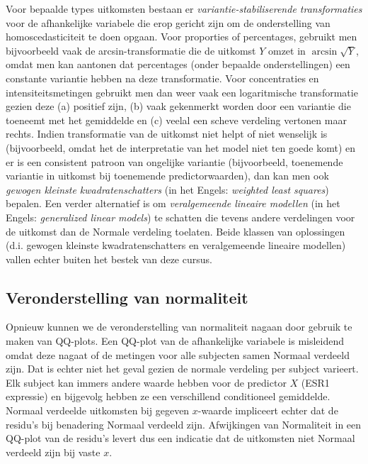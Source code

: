 \documentclass[12pt,dutch,coursenotes]{book}
\theoremstyle{definition}
\theoremstyle{definition}
\theoremstyle{definition}
\theoremstyle{remark}
\begin{document}
Voor bepaalde types uitkomsten bestaan er \emph{variantie-stabiliserende
transformaties} voor de afhankelijke variabele die erop gericht zijn om
de onderstelling van homoscedasticiteit te doen opgaan. Voor proporties
of percentages, gebruikt men bijvoorbeeld vaak de arcsin-transformatie
die de uitkomst \(Y\) omzet in \(\arcsin\sqrt{Y}\), omdat men kan
aantonen dat percentages (onder bepaalde onderstellingen) een constante
variantie hebben na deze transformatie. Voor concentraties en
intensiteitsmetingen gebruikt men dan weer vaak een logaritmische
transformatie gezien deze (a) positief zijn, (b) vaak gekenmerkt worden
door een variantie die toeneemt met het gemiddelde en (c) veelal een
scheve verdeling vertonen maar rechts. Indien transformatie van de
uitkomst niet helpt of niet wenselijk is (bijvoorbeeld, omdat het de
interpretatie van het model niet ten goede komt) en er is een consistent
patroon van ongelijke variantie (bijvoorbeeld, toenemende variantie in
uitkomst bij toenemende predictorwaarden), dan kan men ook \emph{gewogen
kleinste kwadratenschatters} (in het Engels: \emph{weighted least
squares}) bepalen. Een verder alternatief is om \emph{veralgemeende
lineaire modellen} (in het Engels: \emph{generalized linear models}) te
schatten die tevens andere verdelingen voor de uitkomst dan de Normale
verdeling toelaten. Beide klassen van oplossingen (d.i. gewogen kleinste
kwadratenschatters en veralgemeende lineaire modellen) vallen echter
buiten het bestek van deze cursus.

\subsection{Veronderstelling van
normaliteit}\label{veronderstelling-van-normaliteit}

Opnieuw kunnen we de veronderstelling van normaliteit nagaan door
gebruik te maken van QQ-plots. Een QQ-plot van de afhankelijke variabele
is misleidend omdat deze nagaat of de metingen voor alle subjecten samen
Normaal verdeeld zijn. Dat is echter niet het geval gezien de normale
verdeling per subject varieert. Elk subject kan immers andere waarde
hebben voor de predictor \(X\) (ESR1 expressie) en bijgevolg hebben ze
een verschillend conditioneel gemiddelde. Normaal verdeelde uitkomsten
bij gegeven \(x\)-waarde impliceert echter dat de residu's bij
benadering Normaal verdeeld zijn. Afwijkingen van Normaliteit in een
QQ-plot van de residu's levert dus een indicatie dat de uitkomsten niet
Normaal verdeeld zijn bij vaste \(x\).
\end{document}
